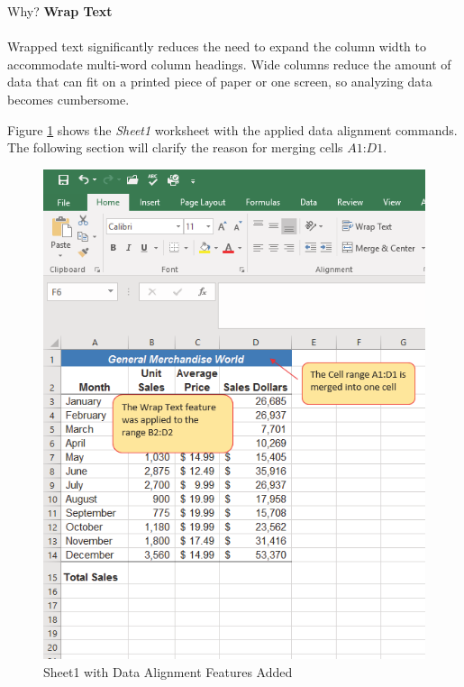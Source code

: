 \begin{center}
	\begin{infobox}{Why?}
		\textbf{Wrap Text}
		\\
		\\
		Wrapped text significantly reduces the need to expand the column width to accommodate multi-word column headings. Wide columns reduce the amount of data that can fit on a printed piece of paper or one screen, so analyzing data becomes cumbersome.
	\end{infobox}
\end{center}

Figure \ref{01:fig40} shows the \textit{Sheet1} worksheet with the applied data alignment commands. The following section will clarify the reason for merging cells $ A1 $:$ D1 $.

\begin{figure}[H]
	\centering
	\includegraphics[width=\maxwidth{.95\linewidth}]{gfx/ch01_fig40}
	\caption{Sheet1 with Data Alignment Features Added}
	\label{01:fig40}
\end{figure}

